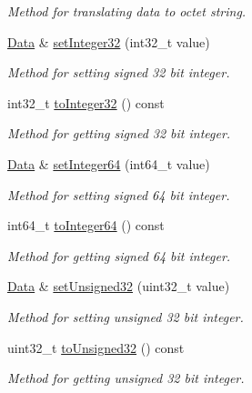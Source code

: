 \begin{DoxyCompactItemize}
\begin{DoxyCompactList}\small\item\em Method for translating data to octet string. \end{DoxyCompactList}\item 
\hyperlink{classDiameter_1_1AVP_1_1Data}{Data} \& \hyperlink{classDiameter_1_1AVP_1_1Data_ae769d186f3fe50131f726fbc843259ea}{set\+Integer32} (int32\+\_\+t value)
\begin{DoxyCompactList}\small\item\em Method for setting signed 32 bit integer. \end{DoxyCompactList}\item 
int32\+\_\+t \hyperlink{classDiameter_1_1AVP_1_1Data_a6af0bac449276561f6fc49cccc4d422f}{to\+Integer32} () const
\begin{DoxyCompactList}\small\item\em Method for getting signed 32 bit integer. \end{DoxyCompactList}\item 
\hyperlink{classDiameter_1_1AVP_1_1Data}{Data} \& \hyperlink{classDiameter_1_1AVP_1_1Data_aa10615ef903cd9806b11fca0bf36a0cf}{set\+Integer64} (int64\+\_\+t value)
\begin{DoxyCompactList}\small\item\em Method for setting signed 64 bit integer. \end{DoxyCompactList}\item 
int64\+\_\+t \hyperlink{classDiameter_1_1AVP_1_1Data_afbff0ff7081269e95f52a47924f92abb}{to\+Integer64} () const
\begin{DoxyCompactList}\small\item\em Method for getting signed 64 bit integer. \end{DoxyCompactList}\item 
\hyperlink{classDiameter_1_1AVP_1_1Data}{Data} \& \hyperlink{classDiameter_1_1AVP_1_1Data_ab0596395222f790540d68b9fcacf868b}{set\+Unsigned32} (uint32\+\_\+t value)
\begin{DoxyCompactList}\small\item\em Method for setting unsigned 32 bit integer. \end{DoxyCompactList}\item 
uint32\+\_\+t \hyperlink{classDiameter_1_1AVP_1_1Data_aa4db9af44641f1dc691fdf4736d0aace}{to\+Unsigned32} () const
\begin{DoxyCompactList}\small\item\em Method for getting unsigned 32 bit integer. \end{DoxyCompactList}\item 

\end{DoxyCompactItemize}

